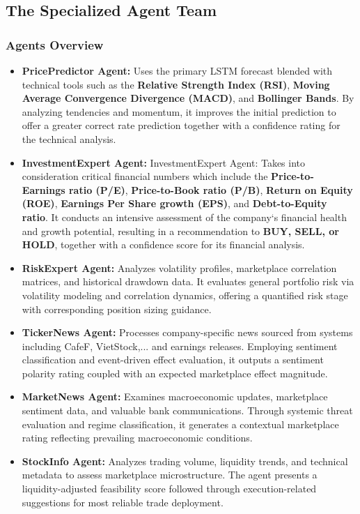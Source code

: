 \documentclass{ieeeaccess}
\begin{document}
\subsection{The Specialized Agent Team}
\subsubsection{Agents Overview}
\begin{itemize}
    \item \textbf{PricePredictor Agent:} 
    Uses the primary LSTM forecast blended with technical tools such as the \textbf{Relative Strength Index (RSI)}, \textbf{Moving Average Convergence Divergence (MACD)}, and \textbf{Bollinger Bands}. By analyzing tendencies and momentum, it improves the initial prediction to offer a greater correct rate prediction together with a confidence rating for the technical analysis.

    \item \textbf{InvestmentExpert Agent:} 
    InvestmentExpert Agent: Takes into consideration critical financial numbers which include the \textbf{Price-to-Earnings ratio (P/E)}, \textbf{Price-to-Book ratio (P/B)}, \textbf{Return on Equity (ROE)}, \textbf{Earnings Per Share growth (EPS)}, and \textbf{Debt-to-Equity ratio}. It conducts an intensive assessment of the company`s financial health and growth potential, resulting in a recommendation to \textbf{BUY, SELL, or HOLD}, together with a confidence score for its financial analysis.

    \item \textbf{RiskExpert Agent:} 
    Analyzes volatility profiles, marketplace correlation matrices, and historical drawdown data. It evaluates general portfolio risk via volatility modeling and correlation dynamics, offering a quantified risk stage with corresponding position sizing guidance.

    \item \textbf{TickerNews Agent:} 
    Processes company-specific news sourced from systems including CafeF, VietStock,... and earnings releases. Employing sentiment classification and event-driven effect evaluation, it outputs a sentiment polarity rating coupled with an expected marketplace effect magnitude.

    \item \textbf{MarketNews Agent:} 
    Examines macroeconomic updates, marketplace sentiment data, and valuable bank communications. Through systemic threat evaluation and regime classification, it generates a contextual marketplace rating reflecting prevailing macroeconomic conditions.

    \item \textbf{StockInfo Agent:} 
    Analyzes trading volume, liquidity trends, and technical metadata to assess marketplace microstructure. The agent presents a liquidity-adjusted feasibility score followed through execution-related suggestions for most reliable trade deployment.
\end{itemize}
\end{document}

